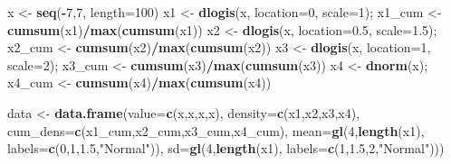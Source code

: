 \documentclass[]{book}
\newenvironment{Shaded}{\begin{snugshade}}{\end{snugshade}}
\newcommand{\KeywordTok}[1]{\textcolor[rgb]{0.13,0.29,0.53}{\textbf{#1}}}
\newcommand{\DataTypeTok}[1]{\textcolor[rgb]{0.13,0.29,0.53}{#1}}
\newcommand{\DecValTok}[1]{\textcolor[rgb]{0.00,0.00,0.81}{#1}}
\newcommand{\FloatTok}[1]{\textcolor[rgb]{0.00,0.00,0.81}{#1}}
\newcommand{\StringTok}[1]{\textcolor[rgb]{0.31,0.60,0.02}{#1}}
\newcommand{\OperatorTok}[1]{\textcolor[rgb]{0.81,0.36,0.00}{\textbf{#1}}}
\newcommand{\NormalTok}[1]{#1}
\begin{document}
\begin{Shaded}
\begin{Highlighting}[]
\NormalTok{x <-}\StringTok{ }\KeywordTok{seq}\NormalTok{(}\OperatorTok{-}\DecValTok{7}\NormalTok{,}\DecValTok{7}\NormalTok{, }\DataTypeTok{length=}\DecValTok{100}\NormalTok{)}
\NormalTok{x1 <-}\StringTok{ }\KeywordTok{dlogis}\NormalTok{(x, }\DataTypeTok{location=}\DecValTok{0}\NormalTok{, }\DataTypeTok{scale=}\DecValTok{1}\NormalTok{); x1_cum <-}\StringTok{ }\KeywordTok{cumsum}\NormalTok{(x1)}\OperatorTok{/}\KeywordTok{max}\NormalTok{(}\KeywordTok{cumsum}\NormalTok{(x1))}
\NormalTok{x2 <-}\StringTok{ }\KeywordTok{dlogis}\NormalTok{(x, }\DataTypeTok{location=}\FloatTok{0.5}\NormalTok{, }\DataTypeTok{scale=}\FloatTok{1.5}\NormalTok{); x2_cum <-}\StringTok{ }\KeywordTok{cumsum}\NormalTok{(x2)}\OperatorTok{/}\KeywordTok{max}\NormalTok{(}\KeywordTok{cumsum}\NormalTok{(x2))}
\NormalTok{x3 <-}\StringTok{ }\KeywordTok{dlogis}\NormalTok{(x, }\DataTypeTok{location=}\DecValTok{1}\NormalTok{, }\DataTypeTok{scale=}\DecValTok{2}\NormalTok{); x3_cum <-}\StringTok{ }\KeywordTok{cumsum}\NormalTok{(x3)}\OperatorTok{/}\KeywordTok{max}\NormalTok{(}\KeywordTok{cumsum}\NormalTok{(x3))}
\NormalTok{x4 <-}\StringTok{ }\KeywordTok{dnorm}\NormalTok{(x); x4_cum <-}\StringTok{ }\KeywordTok{cumsum}\NormalTok{(x4)}\OperatorTok{/}\KeywordTok{max}\NormalTok{(}\KeywordTok{cumsum}\NormalTok{(x4))}

\NormalTok{data <-}\StringTok{ }\KeywordTok{data.frame}\NormalTok{(}\DataTypeTok{value=}\KeywordTok{c}\NormalTok{(x,x,x,x),}
                   \DataTypeTok{density=}\KeywordTok{c}\NormalTok{(x1,x2,x3,x4),}
                   \DataTypeTok{cum_dens=}\KeywordTok{c}\NormalTok{(x1_cum,x2_cum,x3_cum,x4_cum),}
                   \DataTypeTok{mean=}\KeywordTok{gl}\NormalTok{(}\DecValTok{4}\NormalTok{,}\KeywordTok{length}\NormalTok{(x1),}
                       \DataTypeTok{labels=}\KeywordTok{c}\NormalTok{(}\DecValTok{0}\NormalTok{,}\DecValTok{1}\NormalTok{,}\FloatTok{1.5}\NormalTok{,}\StringTok{"Normal"}\NormalTok{)),}
                   \DataTypeTok{sd=}\KeywordTok{gl}\NormalTok{(}\DecValTok{4}\NormalTok{,}\KeywordTok{length}\NormalTok{(x1),}
                       \DataTypeTok{labels=}\KeywordTok{c}\NormalTok{(}\DecValTok{1}\NormalTok{,}\FloatTok{1.5}\NormalTok{,}\DecValTok{2}\NormalTok{,}\StringTok{"Normal"}\NormalTok{)))}


\end{Highlighting}
\end{Shaded}
\end{document}
